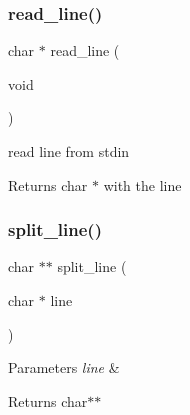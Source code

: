 \subsubsection{read\+\_\+line()}
{\footnotesize\ttfamily char $\ast$ read\+\_\+line (\begin{DoxyParamCaption}\item[{void}]{ }\end{DoxyParamCaption})}



read line from stdin 

\begin{DoxyReturn}{Returns}
char $\ast$ with the line 
\end{DoxyReturn}
\mbox{\label{bash_8c_a67577aefe8264c92b367fc9b4ca068a5}} 
\subsubsection{split\+\_\+line()}
{\footnotesize\ttfamily char $\ast$$\ast$ split\+\_\+line (\begin{DoxyParamCaption}\item[{char $\ast$}]{line }\end{DoxyParamCaption})}


\begin{DoxyParams}{Parameters}
{\em line} & \\
\hline
\end{DoxyParams}
\begin{DoxyReturn}{Returns}
char$\ast$$\ast$ 
\end{DoxyReturn}
